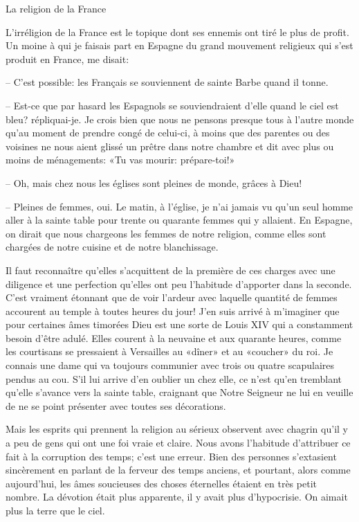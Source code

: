 \begin{chapter}{La religion de la France}

L'irréligion de la France est le topique dont ses ennemis ont tiré le
plus de profit. Un moine à qui je faisais part en Espagne du grand
mouvement religieux qui s'est produit en France, me disait:

-- C'est possible: les Français se souviennent de sainte Barbe quand il
tonne.

-- Est-ce que par hasard les Espagnols se souviendraient d'elle quand le
ciel est bleu? répliquai-je. Je crois bien que nous ne pensons presque
tous à l'autre monde qu'au moment de prendre congé de celui-ci, à moins
que des parentes ou des voisines ne nous aient glissé un prêtre dans
notre chambre et dit avec plus ou moins de ménagements: «Tu vas mourir:
prépare-toi!»

-- Oh, mais chez nous les églises sont pleines de monde, grâces à Dieu!

-- Pleines de femmes, oui. Le matin, à l'église, je n'ai jamais vu qu'un
seul homme aller à la sainte table pour trente ou quarante femmes qui y
allaient. En Espagne, on dirait que nous chargeons les femmes de notre
religion, comme elles sont chargées de notre cuisine et de notre
blanchissage.

Il faut reconnaître qu'elles s'acquittent de la première de ces charges
avec une diligence et une perfection qu'elles ont peu l'habitude
d'apporter dans la seconde. C'est vraiment étonnant que de voir l'ardeur
avec laquelle quantité de femmes accourent au temple à toutes heures du
jour! J'en suis arrivé à m'imaginer que pour certaines âmes timorées
Dieu est une sorte de Louis XIV qui a constamment besoin d'être adulé.
Elles courent à la neuvaine et aux quarante heures, comme les courtisans
se pressaient à Versailles au «dîner» et au «coucher» du roi. Je connais
une dame qui va toujours communier avec trois ou quatre scapulaires
pendus au cou. S'il lui arrive d'en oublier un chez elle, ce n'est qu'en
tremblant qu'elle s'avance vers la sainte table, craignant que Notre
Seigneur ne lui en veuille de ne se point présenter avec toutes ses
décorations.

Mais les esprits qui prennent la religion au sérieux observent avec
chagrin qu'il y a peu de gens qui ont une foi vraie et claire. Nous
avons l'habitude d'attribuer ce fait à la corruption des temps; c'est
une erreur. Bien des personnes s'extasient sincèrement en parlant de la
ferveur des temps anciens, et pourtant, alors comme aujourd'hui, les
âmes soucieuses des choses éternelles étaient en très petit nombre. La
dévotion était plus apparente, il y avait plus d'hypocrisie. On aimait
plus la terre que le ciel.


\end{chapter}
